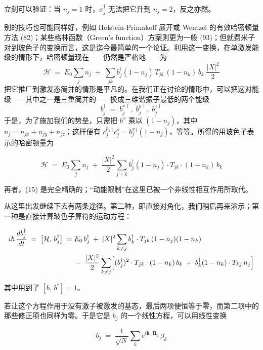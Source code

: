 立刻可以验证：当 $n_j = 1$ 时，$\sigma_j^{\dagger}$ 无法把它升到 $n_j = 2$，反之亦然。

别的技巧也可能同样好，例如 Holstein-Primakoff 展开或 Wentzel 的有效哈密顿量方法 (82)；某些格林函数（Green's function）方案则更为一般 (93)；但就费米子对到玻色子的变换而言，这是迄今最简单的一个论证。利用这一变换，在单激发能级的情形下，哈密顿量现在——仍然是严格地——为
\begin{equation*}
\mathcal{H} \;=\; E_0 \sum_j n_j \;+\; \sum_{jk} b_j^{\dagger}(1-n_j)\, T_{jk}\, (1-n_k)\, b_k\; \frac{|X|^2}{2}
\end{equation*}
把它推广到激发态简并的情形是平凡的。在我们正在讨论的情形中，可以把这对能级——其中之一是三重简并的——换成三维谐振子最低的两个能级
\begin{equation*}
b_j^{\dagger} \;=\; b_j^{x\dagger},\; b_j^{y\dagger},\; b_j^{z\dagger}
\end{equation*}
于是，为了施加我们的势垒，只需把 $b^x$ 乘以 $(1-n_j)$，其中 $n_j = n_{jx} + n_{jy} + n_{jz}$；这样便有 $c_j^{p_x}{}^{\dagger} c_j^{s} = b_j^{x}{}^{\dagger}(1-n_j)$，等等。所得的用玻色子表示的哈密顿量为


\begin{equation*}
\mathcal{H} \;=\; E_0 \sum_j n_j \;+\; \frac{|X|^{2}}{2} \sum_{j\neq k} b_j^{\dagger}(1-n_j)\cdot T_{jk}\cdot(1-n_k)\, b_k \tag{15}
\end{equation*}

再者，(15) 是完全精确的；“动能限制”在这里已被一个非线性相互作用所取代。

从这里出发继续下去有两条途径。第二种，即直接对角化，我们稍后再来演示；第一种是直接计算玻色子算符的运动方程：

\begin{align*}
i\hbar\,\frac{db_j^{\dagger}}{dt} \;=\; \bigl[\mathcal{H},\, b_j^{\dagger}\bigr] \;=\;& E_0\, b_j^{\dagger} \;+\; |X|^{2} \sum_{k\neq j} b_k^{\dagger}\cdot T_{jk}\,(1-n_j)(1-n_k) \\
&-\; \frac{|X|^{2}}{2} \sum_{k\neq j} \Bigl[(b_j^{\dagger})^{2}\cdot T_{jk}\cdot(1-n_k)\, b_k \;+\; b_k^{\dagger}(1-n_k)\cdot T_{kj}\, n_j\Bigr]
\end{align*}

其中用到了 $[b,\, b^{\dagger}]=1$。

若让这个方程作用于没有激子被激发的基态，最后两项便恒等于零，而第二项中的那些修正项也同样为零。于是它是 $b_j$ 的一个线性方程，可以用线性变换

\begin{equation*}
b_j \;=\; \frac{1}{\sqrt{N}} \sum_k e^{i\mathbf{k}\cdot\mathbf{R}_j}\, \beta_k
\end{equation*}

